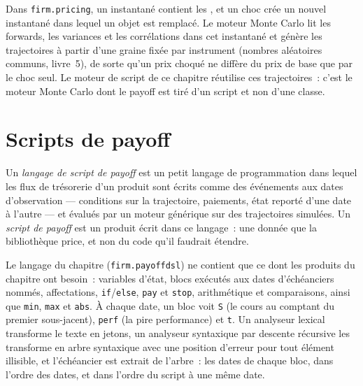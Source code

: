 Dans \texttt{firm.pricing}, un instantané contient les , et un choc crée un nouvel instantané dans lequel un objet est remplacé. Le moteur Monte Carlo
lit les forwards, les variances et les corrélations dans cet instantané et génère les trajectoires à partir d'une graine fixée par instrument (nombres aléatoires communs, livre~5), de sorte
qu'un prix choqué ne diffère du prix de base que par le choc seul. Le moteur de script de ce chapitre réutilise ces trajectoires~: c'est le moteur Monte Carlo
dont le payoff est tiré d'un script et non d'une classe.

\section{Scripts de payoff}

\begin{definition}\label{def:pl:pricing-library-architecture:script}
Un \emph{langage de script de payoff} est un petit langage de programmation dans lequel les flux de trésorerie d'un produit sont
écrits comme des événements aux dates d'observation --- conditions sur la trajectoire, paiements, état reporté d'une date à l'autre --- et évalués par un
moteur générique sur des trajectoires simulées. Un \emph{script de payoff} est un produit écrit dans ce langage~: une donnée que la bibliothèque price,
et non du code qu'il faudrait étendre.
\end{definition}

Le langage du chapitre (\texttt{firm.payoffdsl}) ne contient que ce dont les produits du chapitre ont besoin~: variables d'état, blocs exécutés aux dates
d'échéanciers nommés, affectations, \texttt{if}/\texttt{else}, \texttt{pay} et \texttt{stop}, arithmétique et comparaisons, ainsi que
\texttt{min}, \texttt{max} et \texttt{abs}. À chaque date, un bloc voit \texttt{S} (le cours au comptant du premier sous-jacent), \texttt{perf} (la pire
performance) et \texttt{t}. Un analyseur lexical transforme le texte en jetons, un analyseur syntaxique par descente récursive les transforme en arbre syntaxique avec une
position d'erreur pour tout élément illisible, et l'échéancier est extrait de l'arbre~: les dates de chaque bloc, dans l'ordre des dates, et dans l'ordre du script
à une même date.

